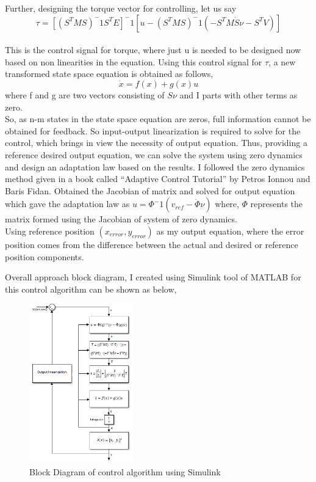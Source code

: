 \documentclass[12pt]{article}
\begin{document}
Further, designing the torque vector for controlling, let us say \\
\begin{equation*}
\tau=[(S^TMS)^-1S^TE]^-1[u-(S^TMS)^-1(-S^TM\dot{S}\nu-S^TV)]
\end{equation*}
\\This is the control signal for torque, where just u is needed to be designed now based on non linearities in the equation.
Using this control signal for $\tau$, a new transformed state space equation is obtained as follows,
\[\dot{x}=f(x)+g(x)u\]
where f and g are two vectors consisting of $S\nu$ and I parts with other terms as zero.\\
So, as n-m states in the state space equation are zeros, full information cannot be obtained for feedback. So input-output linearization is required to solve for the control, which brings in view the necessity of  output equation. Thus, providing a reference desired output equation, we can solve the system using zero dynamics and design an adaptation law based on the results. 
I followed the zero dynamics method given in a book called “Adaptive Control Tutorial” by  Petros Ionnou and Baris Fidan. Obtained the Jacobian of matrix and solved for output equation which gave the adaptation law as $u=\Phi^-1(v_{ref}-\dot{\Phi}\nu)$
where, $\Phi$ represents the matrix formed using the Jacobian of system of zero dynamics.\\
Using reference position $(x_{error}, y_{error})$ as my output equation, where the error position comes from the difference between the actual and desired or reference position components. 

Overall approach block diagram, I created using Simulink tool of MATLAB for this control algorithm can be shown as below, 
\begin{figure}[H]
\centering
\includegraphics[width=0.4\textwidth]{final__1_.PNG}
\captionsetup{labelformat=empty}
\caption{Block Diagram of control algorithm using Simulink}
\end{figure}
\end{document}
